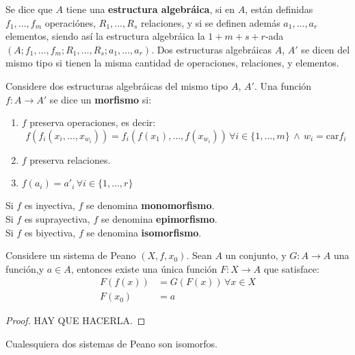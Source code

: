 \begin{definition}
  Se dice que $A$ tiene una \textbf{estructura algebráica}, si en $A$, están
  definidas $f_1, \ldots, f_m$ operaciónes, $R_1, \ldots, R_s$ relaciones, y
  si se definen además $a_1, \ldots, a_r$ elementos, siendo así la estructura
  algebráica la $1+m+s+r$-ada $(A;f_1, \ldots, f_m; R_1, \ldots, R_s; a_1,
  \ldots, a_r)$. Dos estructuras algebráicas $A$, $A'$ se dicen del mismo tipo si tienen
  la misma cantidad de operaciones, relaciones, y elementos.
\end{definition}
\begin{definition}
  Considere dos estructuras algebráicas del mismo tipo $A$, $A'$. Una función
  $f: A \rightarrow A'$ se dice un \textbf{morfismo} si:
  \begin{enumerate}
    \item $f$ preserva operaciones, es decir:
      \[
        f(f_i(x_i,\ldots,x_w_i)) = f_i(f(x_1),\ldots, f(x_w_i)) \,
        \forall i \in \{1,\ldots, m\}\, \land \, w_i = \mathrm{car} f_i
      \]
    \item $f$ preserva relaciones.
    \item $f(a_i) = a'_i \, \forall i \in \{1,\ldots, r\}$
  \end{enumerate}
  Si $f$ es inyectiva, $f$ se denomina \textbf{monomorfismo}.\\
  Si $f$ es suprayectiva, $f$ se denomina \textbf{epimorfismo}. \\
  Si $f$ es biyectiva, $f$ se denomina \textbf{isomorfismo}.
\end{definition}
\begin{proposition}\label{prop:34}
  Considere un sistema de Peano $(X, f, x_0)$. Sean $A$ un conjunto, y $G:A
  \rightarrow A$ una función,y $a\in A$, entonces existe una única función $F:X
  \rightarrow A$ que satisface:
  \begin{align*}
    F(f(x)) &= G(F(x)) \, \forall x \in X \\
    F(x_0) &= a
  \end{align*}
\end{proposition}
\begin{proof}
  HAY QUE HACERLA.
\end{proof}
\begin{proposition}\label{prop:35}
  Cualesquiera dos sistemas de Peano son isomorfos.
\end{proposition}

